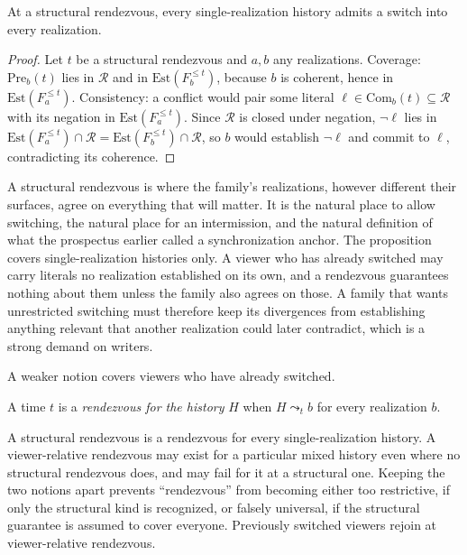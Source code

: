 \begin{proposition}\label{prop:rendezvous}
At a structural rendezvous, every single-realization history admits a switch into every realization.
\end{proposition}

\begin{proof}
Let $t$ be a structural rendezvous and $a,b$ any realizations. Coverage: $\mathrm{Pre}_b(t)$ lies in $\mathcal R$ and in $\mathrm{Est}(F_b^{\le t})$, because $b$ is coherent, hence in $\mathrm{Est}(F_a^{\le t})$. Consistency: a conflict would pair some literal $\ell\in\mathrm{Com}_b(t)\subseteq\mathcal R$ with its negation in $\mathrm{Est}(F_a^{\le t})$. Since $\mathcal R$ is closed under negation, $\neg\ell$ lies in $\mathrm{Est}(F_a^{\le t})\cap\mathcal R=\mathrm{Est}(F_b^{\le t})\cap\mathcal R$, so $b$ would establish $\neg\ell$ and commit to $\ell$, contradicting its coherence.
\end{proof}

A structural rendezvous is where the family's realizations, however different their surfaces, agree on everything that will matter. It is the natural place to allow switching, the natural place for an intermission, and the natural definition of what the prospectus earlier called a synchronization anchor. The proposition covers single-realization histories only. A viewer who has already switched may carry literals no realization established on its own, and a rendezvous guarantees nothing about them unless the family also agrees on those. A family that wants unrestricted switching must therefore keep its divergences from establishing anything relevant that another realization could later contradict, which is a strong demand on writers.

A weaker notion covers viewers who have already switched.

\begin{definition}
A time $t$ is a \emph{rendezvous for the history} $H$ when $H\leadsto_t b$ for every realization $b$.
\end{definition}

A structural rendezvous is a rendezvous for every single-realization history. A viewer-relative rendezvous may exist for a particular mixed history even where no structural rendezvous does, and may fail for it at a structural one. Keeping the two notions apart prevents ``rendezvous'' from becoming either too restrictive, if only the structural kind is recognized, or falsely universal, if the structural guarantee is assumed to cover everyone. Previously switched viewers rejoin at viewer-relative rendezvous.

